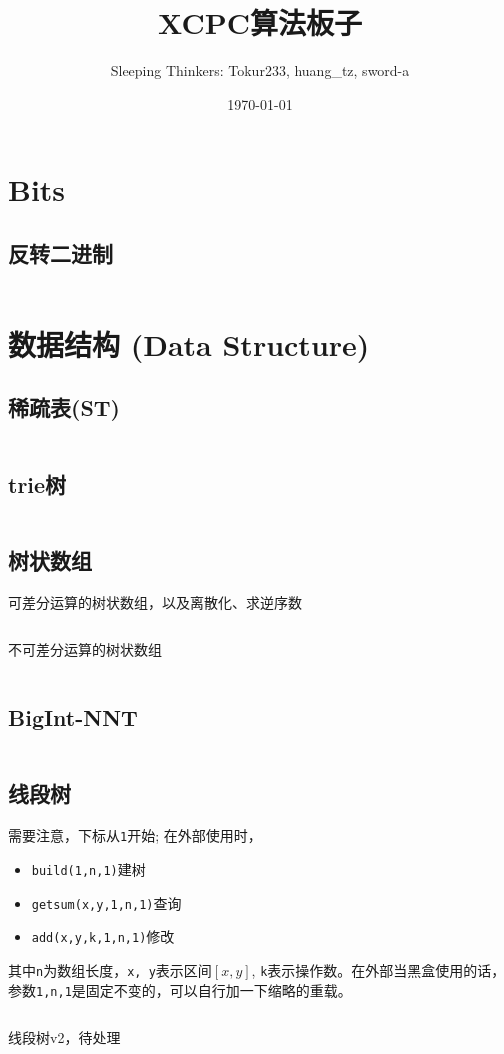 \documentclass[openany,a4paper]{book}
\title{\Huge XCPC算法板子}
\author{Sleeping Thinkers: Tokur233, huang\_tz, sword-a}
\date{\today}
\begin{document}
\maketitle

\tableofcontents

\chapter{Bits}

\section{反转二进制}
\inputminted{cpp}{Bits/bits.h}

\chapter{数据结构 (Data Structure)}

\section{稀疏表(ST)}
\inputminted{cpp}{DataStructure/ST.hpp}

\section{trie树}
\inputminted{cpp}{DataStructure/trie.h}

\section{树状数组}
可差分运算的树状数组，以及离散化、求逆序数
\inputminted{cpp}{DataStructure/BIT.hpp}
不可差分运算的树状数组
\inputminted{cpp}{DataStructure/BIT-nodiff.hpp}

\section{BigInt-NNT}
\inputminted{cpp}{DataStructure/BigInt-NNT.hpp}

\section{线段树}
需要注意，下标从\verb|1|开始; 在外部使用时，
\begin{itemize}
    \item \verb|build(1,n,1)|建树
    \item \verb|getsum(x,y,1,n,1)|查询
    \item \verb|add(x,y,k,1,n,1)|修改
\end{itemize}
其中\verb|n|为数组长度，\verb|x, y|表示区间$[x,y]$, \verb|k|表示操作数。在外部当黑盒使用的话，参数\verb|1,n,1|是固定不变的，可以自行加一下缩略的重载。
\inputminted{cpp}{DataStructure/segmentTree.h}
线段树v2，待处理
\inputminted{cpp}{DataStructure/segmentTree_2.h}
\end{document}
